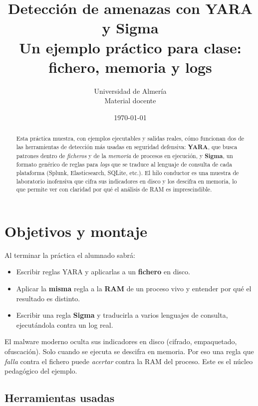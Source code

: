 \documentclass[11pt,a4paper]{article}
\title{\vspace{-1cm}\textbf{\color{azulUAL} Detección de amenazas con YARA y Sigma}\\[4pt]
\large Un ejemplo práctico para clase: fichero, memoria y logs}
\author{Universidad de Almería \\ \small Material docente}
\date{\today}
\begin{document}
\maketitle
\thispagestyle{fancy}

\begin{abstract}
\noindent
Esta práctica muestra, con ejemplos ejecutables y salidas reales, cómo funcionan
dos de las herramientas de detección más usadas en seguridad defensiva:
\textbf{YARA}, que busca patrones dentro de \emph{ficheros} y de la \emph{memoria}
de procesos en ejecución, y \textbf{Sigma}, un formato genérico de reglas para
\emph{logs} que se traduce al lenguaje de consulta de cada plataforma (Splunk,
Elasticsearch, SQLite, etc.). El hilo conductor es una muestra de laboratorio
inofensiva que cifra sus indicadores en disco y los descifra en memoria, lo que
permite ver con claridad por qué el análisis de RAM es imprescindible.
\end{abstract}

\tableofcontents
\vspace{0.5cm}

\section{Objetivos y montaje}

Al terminar la práctica el alumnado sabrá:
\begin{itemize}[leftmargin=1.4em]
  \item Escribir reglas YARA y aplicarlas a un \textbf{fichero} en disco.
  \item Aplicar la \textbf{misma} regla a la \textbf{RAM} de un proceso vivo y
        entender por qué el resultado es distinto.
  \item Escribir una regla \textbf{Sigma} y traducirla a varios lenguajes de
        consulta, ejecutándola contra un log real.
\end{itemize}

\begin{ideaclave}
El malware moderno oculta sus indicadores en disco (cifrado, empaquetado,
ofuscación). Solo cuando se ejecuta se descifra en memoria. Por eso una regla que
\emph{falla} contra el fichero puede \emph{acertar} contra la RAM del proceso.
Este es el núcleo pedagógico del ejemplo.
\end{ideaclave}

\subsection*{Herramientas usadas}
\end{document}
